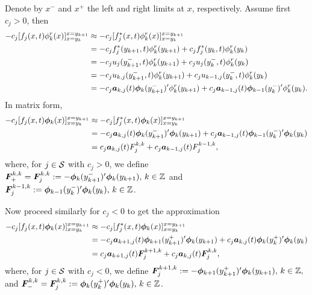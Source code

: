 Denote by \(x^-\) and \(x^+\) the left and right limits at \(x\), respectively. Assume first \(c_j>0\), then 
\begin{align*}
	-c_j[f_j(x,t)\phi^r_k(x)]_{x=y_k}^{x=y_{k+1}} & \approx -c_j[f_j^*(x,t)\phi^r_k(x)]_{x=y_k}^{x=y_{k+1}}
	\\& = -c_jf_j^*(y_{k+1},t)\phi^r_k(y_{k+1}) + c_jf_j^*(y_{k},t)\phi^r_k(y_{k})
	\\& = -c_ju_j(y_{k+1}^-,t)\phi^r_k(y_{k+1}) + c_ju_j(y_{k}^-,t)\phi^r_k(y_{k})
	\\& = -c_ju_{k,j}(y_{k+1}^-,t)\phi^r_k(y_{k+1}) + c_ju_{k-1,j}(y_{k}^-,t)\phi^r_k(y_{k})
	\\& = -c_j\boldsymbol a_{k,j}(t)\boldsymbol \phi_k(y_{k+1}^-)'{}\phi^r_k(y_{k+1}) + c_j\boldsymbol a_{k-1,j}(t)\boldsymbol \phi_{k-1}(y_{k}^-)'{}\phi^r_k(y_{k}).
\end{align*}
In matrix form,  
\begin{align*}
	-c_j[f_j(x,t)\boldsymbol\phi_k(x)]_{x=y_k}^{x=y_{k+1}} & \approx -c_j[f_j^*(x,t)\boldsymbol\phi_k(x)]_{x=y_k}^{x=y_{k+1}}
	\\& = -c_j\boldsymbol a_{k,j}(t)\boldsymbol \phi_k(y_{k+1}^-)'{}\boldsymbol\phi_k(y_{k+1}) + c_j\boldsymbol a_{k-1,j}(t)\boldsymbol \phi_{k-1}(y_{k}^-)'{}\boldsymbol\phi_k(y_{k})
	\\& = c_j\boldsymbol a_{k,j}(t)F_j^{k,k}+c_j\boldsymbol a_{k-1,j}(t)F_j^{k-1,k},
\end{align*}
where, for \(j\in \mathcal{S}\) with \(c_j>0\), we define \(\boldsymbol F_+^{k,k}=\boldsymbol F_j^{k,k} := -\boldsymbol \phi_k(y_{k+1}^-)'{}\boldsymbol\phi_k(y_{k+1}),\,k\in\mathbb Z\) and \(\boldsymbol F_j^{k-1,k} := \boldsymbol \phi_{k-1}(y_{k}^-)'{}\boldsymbol\phi_k(y_{k}),\,k\in\mathbb Z\).

Now proceed similarly for \(c_j<0\) to get the approximation 
\begin{align*}
	-c_j[f_j(x,t)\boldsymbol\phi_k(x)]_{x=y_k}^{x=y_{k+1}} & \approx -c_j[f_j^*(x,t)\boldsymbol\phi_k(x)]_{x=y_k}^{x=y_{k+1}}
	\\& = -c_j\boldsymbol a_{k+1,j}(t)\boldsymbol \phi_{k+1}(y_{k+1}^+)'{}\boldsymbol\phi_k(y_{k+1}) + c_j\boldsymbol a_{k,j}(t)\boldsymbol \phi_{k}(y_{k}^+)'{}\boldsymbol\phi_k(y_{k})
	\\& = c_j\boldsymbol a_{k+1,j}(t)\boldsymbol F_j^{k+1,k}+c_j\boldsymbol a_{k,j}(t)\boldsymbol F_j^{k,k},
\end{align*}
where, for \(j\in \mathcal{S}\) with \(c_j<0\), we define \(\boldsymbol F_j^{k+1,k} := -\boldsymbol \phi_{k+1}(y_{k+1}^+)'{}\boldsymbol\phi_k(y_{k+1}),\,k\in\mathbb Z,\) and \(\boldsymbol F_-^{k,k}=\boldsymbol F_j^{k,k} := \boldsymbol \phi_{k}(y_{k}^+)'{}\boldsymbol\phi_k(y_{k}),\,k\in\mathbb Z\).

